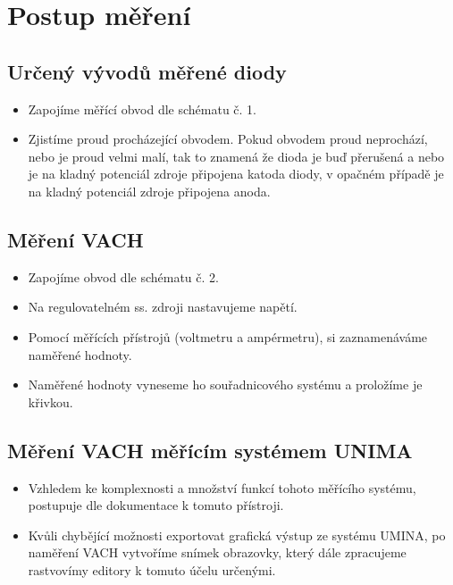 \section{Postup měření}
  \subsection{Určený vývodů měřené diody}
    \begin{itemize}
      \item
        Zapojíme měřící obvod dle schématu č. 1.
      \item
      	Zjistíme proud procházející obvodem. Pokud obvodem proud neprochází, nebo je proud velmi malí, tak to znamená že dioda je buď přerušená a nebo je na kladný potenciál zdroje připojena katoda diody, v opačném případě je na kladný potenciál zdroje připojena anoda.
		\end{itemize}
		
	\subsection{Měření VACH}
    \begin{itemize}
      \item
        Zapojíme obvod dle schématu č. 2.
      \item
      	Na regulovatelném ss. zdroji nastavujeme napětí.
      \item
        Pomocí měřících přístrojů (voltmetru a ampérmetru), si zaznamenáváme naměřené hodnoty.  
      \item
        Naměřené hodnoty vyneseme ho souřadnicového systému a proložíme je křivkou.
		\end{itemize}
		
	\subsection{Měření VACH měřícím systémem UNIMA}
    \begin{itemize}
      \item
        Vzhledem ke komplexnosti a množství funkcí tohoto měřícího systému, postupuje dle dokumentace k tomuto přístroji.
      \item
      	Kvůli chybějící možnosti exportovat grafická výstup ze systému UMINA, po naměření VACH vytvoříme snímek obrazovky, který dále zpracujeme rastvovímy editory k tomuto účelu určenými.
		\end{itemize}
